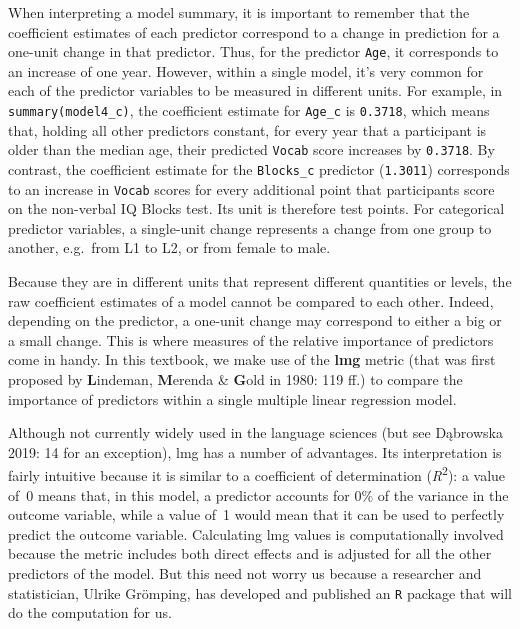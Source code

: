\documentclass[
  letterpaper,
  DIV=11,
  numbers=noendperiod]{scrreprt}
\begin{document}
When interpreting a model summary, it is important to remember that the
coefficient estimates of each predictor correspond to a change in
prediction for a one-unit change in that predictor. Thus, for the
predictor \texttt{Age}, it corresponds to an increase of one year.
However, within a single model, it's very common for each of the
predictor variables to be measured in different units. For example, in
\texttt{summary(model4\_c)}, the coefficient estimate for
\texttt{Age\_c} is \texttt{0.3718}, which means that, holding all other
predictors constant, for every year that a participant is older than the
median age, their predicted \texttt{Vocab} score increases by
\texttt{0.3718}. By contrast, the coefficient estimate for the
\texttt{Blocks\_c} predictor (\texttt{1.3011}) corresponds to an
increase in \texttt{Vocab} scores for every additional point that
participants score on the non-verbal IQ Blocks test. Its unit is
therefore test points. For categorical predictor variables, a
single-unit change represents a change from one group to another,
e.g.~from L1 to L2, or from female to male.

Because they are in different units that represent different quantities
or levels, the raw coefficient estimates of a model cannot be compared
to each other. Indeed, depending on the predictor, a one-unit change may
correspond to either a big or a small change. This is where measures of
the relative importance of predictors come in handy. In this textbook,
we make use of the \textbf{lmg} metric (that was first proposed by
\textbf{L}indeman, \textbf{M}erenda \& \textbf{G}old in 1980: 119 ff.)
to compare the importance of predictors within a single multiple linear
regression model.

Although not currently widely used in the language sciences (but see
Dąbrowska 2019: 14 for an exception), lmg has a number of advantages.
Its interpretation is fairly intuitive because it is similar to a
coefficient of determination (\emph{R}\textsuperscript{2}): a value of~0
means that, in this model, a predictor accounts for 0\% of the variance
in the outcome variable, while a value of~1 would mean that it can be
used to perfectly predict the outcome variable. Calculating lmg values
is computationally involved because the metric includes both direct
effects and is adjusted for all the other predictors of the model. But
this need not worry us because a researcher and statistician, Ulrike
Grömping, has developed and published an \texttt{R} package that will do
the computation for us.~
\end{document}
